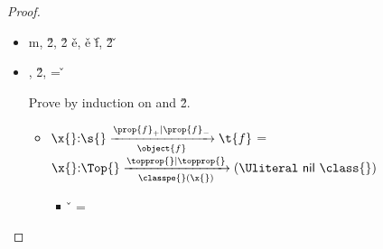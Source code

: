 \begin{lemma}
\begin{enumerate}
\begin{proof}
\begin{case}[T-App]
\begin{itemize}
\begin{subcase}[B-BetaClosure]
\end{subcase}
  \item[]
\begin{subcase}[B-BetaMulti]
  \opsem {\openv{}}
         {}
         { {m}},
  \opsem {\openv{}}
         {}
         {\v{2}},
  \opsem {\openv{}}
         { {\v{2}}}
         {\v{e}},
  \getmethod {\disptable{}}
             {\v{e}}
             {\v{f}},
  \opsem {\openv{}}
         { {\v{2}}}
         {\v{}}

\end{subcase}
  \item[]
\begin{subcase}[B-Delta]
  \opsem {\openv{}} {} {\const{}},
  \opsem {\openv{}} {} {\v{2}},
   = \v{}


  Prove by induction on \const{} and \v{2}.
  \begin{itemize}
    \item[] \begin{subcase}[\const{} = \classconst]
    ${\ArrowOne {\x{}} {\s{}}
                                                       {\t{f}}
                                                       {\filterset {\thenprop {\prop{f}}}
                                                                   {\elseprop {\prop{f}}}}
                                                       {\object{f}}}$
                                                       =
  ${\ArrowOne {\x{}} {\Top{}}
                                      {\Union{\nil{}}{\class{}}}
                                      {\filterset {\topprop{}}
                                                  {\topprop{}}}
                                      {\path {\classpe{}} {\x{}}}}$

        \begin{itemize}
          \item[] \begin{subcase}[\v{2} = \classvalue{\class{}} {\overrightarrow {\classfieldpair{\fld{i}} {\v{i}}}}]
                    \v{} = \class{}


\end{subcase}
\end{itemize}
\end{subcase}
\end{itemize}
\end{subcase}
\end{itemize}
\end{case}
\end{proof}
\end{enumerate}
\end{lemma}
